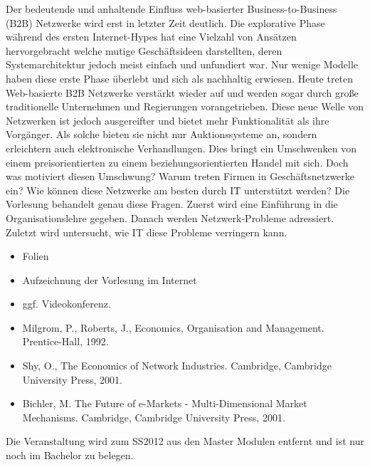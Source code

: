 \begin{course}
\begin{content}
Der bedeutende und anhaltende Einfluss web-basierter Business-to-Business (B2B) Netzwerke wird erst in letzter Zeit deutlich. Die explorative Phase während des ersten Internet-Hypes hat eine Vielzahl von Ansätzen hervorgebracht welche mutige Geschäftsideen darstellten, deren Systemarchitektur jedoch meist einfach und unfundiert war. Nur wenige Modelle haben diese erste Phase überlebt und sich als nachhaltig erwiesen. Heute treten Web-basierte B2B Netzwerke verstärkt wieder auf und werden sogar durch große traditionelle Unternehmen und Regierungen vorangetrieben. Diese neue Welle von Netzwerken ist jedoch ausgereifter und bietet mehr Funktionalität als ihre Vorgänger. Als solche bieten sie nicht nur Auktionssysteme an, sondern erleichtern auch elektronische Verhandlungen. Dies bringt ein Umschwenken von einem preisorientierten zu einem beziehungsorientierten Handel mit sich. Doch was motiviert diesen Umschwung? Warum treten Firmen in Geschäftsnetzwerke ein? Wie können diese Netzwerke am besten durch IT unterstützt werden? Die Vorlesung behandelt genau diese Fragen. Zuerst wird eine Einführung in die Organisationslehre gegeben. Danach werden Netzwerk-Probleme adressiert. Zuletzt wird untersucht, wie IT diese Probleme verringern kann.


\end{content}

\begin{media}\begin{itemize}\item Folien  \item Aufzeichnung der Vorlesung im Internet  \item ggf. Videokonferenz.  \end{itemize}\end{media}

\begin{literature}\begin{itemize}\item Milgrom, P., Roberts, J., Economics, Organisation and Management. Prentice-Hall, 1992.  \item Shy, O., The Economics of Network Industries. Cambridge, Cambridge University Press, 2001.  \item Bichler, M. The Future of e-Markets - Multi-Dimensional Market Mechanisms. Cambridge, Cambridge University Press, 2001.  \end{itemize}\end{literature}

\begin{remarks}Die Veranstaltung wird zum SS2012 aus den Master Modulen entfernt und ist nur noch im Bachelor zu belegen. 

\end{remarks}

\end{course}